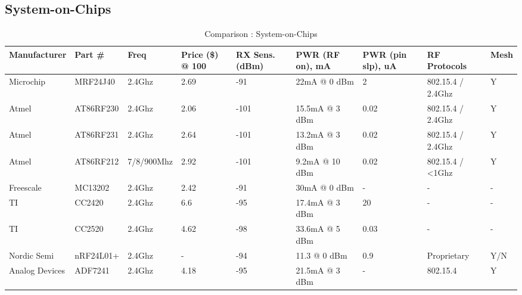  \begin{landscape}
 \subsection{System-on-Chips}\label{sec:table-socs}

   \begin{table}[h]
     \centering
     \begin{tabularx}{2\textwidth}{l l l p{1.5cm} p{1.5cm} l p{2.5cm} l l}
        Manufacturer   & Part \#   & Freq       & Price (\$) @ 100 & RX Sens. (dBm) & PWR (RF on), mA & PWR (pin slp), uA & RF Protocols      & Mesh \\ \hline
        Microchip      & MRF24J40  & 2.4Ghz     & 2.69            & -91            & 22mA @ 0 dBm      & 2                 & 802.15.4 / 2.4Ghz & Y    \\ 
        Atmel          & AT86RF230 & 2.4Ghz     & 2.06            & -101           & 15.5mA @ 3 dBm    & 0.02              & 802.15.4 / 2.4Ghz & Y    \\ 
        Atmel          & AT86RF231 & 2.4Ghz     & 2.64            & -101           & 13.2mA @ 3 dBm    & 0.02              & 802.15.4 / 2.4Ghz & Y    \\ 
        Atmel          & AT86RF212 & 7/8/900Mhz & 2.92            & -101           & 9.2mA @ 10 dBm    & 0.02              & 802.15.4 / <1Ghz  & Y    \\ 
        Freescale      & MC13202   & 2.4Ghz     & 2.42            & -91            & 30mA @ 0 dBm      & -                 & -                 & -    \\ 
        TI             & CC2420    & 2.4Ghz     & 6.6             & -95            & 17.4mA @ 3 dBm    & 20                & -                 & -    \\ 
        TI             & CC2520    & 2.4Ghz     & 4.62            & -98            & 33.6mA @ 5 dBm    & 0.03              & -                 & -    \\ 
        Nordic Semi    & nRF24L01+ & 2.4Ghz     & -               & -94            & 11.3 @ 0 dBm      & 0.9               & Proprietary       & Y/N  \\ 
        Analog Devices & ADF7241   & 2.4Ghz     & 4.18            & -95            & 21.5mA @ 3 dBm    & -                 & 802.15.4          & Y    \\ 
     \end{tabularx}
     \caption{Comparison : System-on-Chips}
     \label{tab:soc-comparison}
   \end{table}
 \end{landscape}

